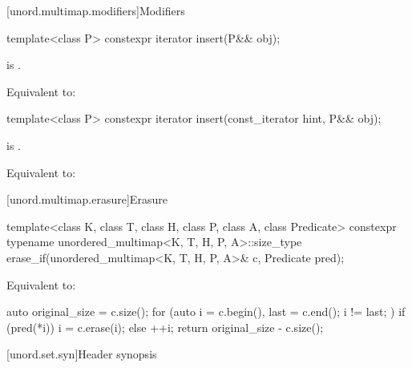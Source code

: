 [unord.multimap.modifiers]{Modifiers}

%
\begin{itemdecl}
template<class P>
  constexpr iterator insert(P&& obj);
\end{itemdecl}

\begin{itemdescr}
\pnum
\constraints
{} is .

\pnum
\effects
Equivalent to: 
\end{itemdescr}

%
\begin{itemdecl}
template<class P>
  constexpr iterator insert(const_iterator hint, P&& obj);
\end{itemdecl}

\begin{itemdescr}
\pnum
\constraints
{} is .

\pnum
\effects
Equivalent to:
\end{itemdescr}

[unord.multimap.erasure]{Erasure}

%
\begin{itemdecl}
template<class K, class T, class H, class P, class A, class Predicate>
  constexpr typename unordered_multimap<K, T, H, P, A>::size_type
    erase_if(unordered_multimap<K, T, H, P, A>& c, Predicate pred);
\end{itemdecl}

\begin{itemdescr}
\pnum
\effects
Equivalent to:
\begin{codeblock}
auto original_size = c.size();
for (auto i = c.begin(), last = c.end(); i != last; ) {
  if (pred(*i)) {
    i = c.erase(i);
  } else {
    ++i;
  }
}
return original_size - c.size();
\end{codeblock}
\end{itemdescr}

[unord.set.syn]{Header  synopsis}

